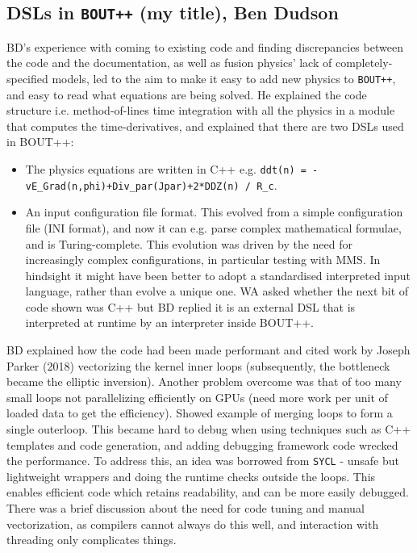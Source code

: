 \documentclass[11pt]{article}
\begin{document}
\subsection{DSLs in {\tt BOUT++} (my title), Ben Dudson}

BD's experience with coming to existing code and finding discrepancies
between the code and the documentation, as well as fusion physics'
lack of completely-specified models, led to the aim to make it easy to
add new physics to {\tt BOUT++}, and easy to read what equations are
being solved.  He explained the code structure i.e. method-of-lines
time integration with all the physics in a module that computes the
time-derivatives, and explained that there are two DSLs used in
BOUT++:
\begin{itemize}
  \item The physics equations are written in C++ e.g. {\tt ddt(n) = 
    -vE\_Grad(n,phi)+Div\_par(Jpar)+2*DDZ(n) / R\_c}.
  \item An input configuration file format. This evolved from a simple
    configuration file (INI format), and now it can e.g. parse complex
    mathematical formulae, and is Turing-complete. This evolution was
    driven by the need for increasingly complex configurations, in
    particular testing with MMS. In hindsight it might have been
    better to adopt a standardised interpreted input language, rather
    than evolve a unique one.  WA asked whether the next bit of code shown
    was C++ but BD replied it is an external DSL that is interpreted
    at runtime by an interpreter inside BOUT++.
\end{itemize}


BD explained how the code had been made performant and cited work by
Joseph Parker (2018) vectorizing the kernel inner loops (subsequently,
the bottleneck became the elliptic inversion).  Another problem
overcome was that of too many small loops not parallelizing
efficiently on GPUs (need more work per unit of loaded data to get the
efficiency).  Showed example of merging loops to form a single
outerloop.  This became hard to debug when using techniques such as
C++ templates and code generation, and adding debugging framework code
wrecked the performance. To address this, an idea was borrowed from
{\tt SYCL} - unsafe but lightweight wrappers and doing the runtime
checks outside the loops. This enables efficient code which retains
readability, and can be more easily debugged. There was a brief
discussion about the need for code tuning and manual vectorization, as
compilers cannot always do this well, and interaction with threading
only complicates things.
\end{document}
